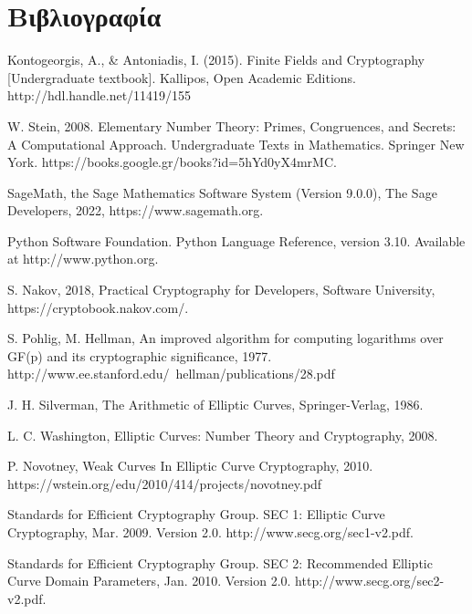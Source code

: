 \documentclass[oneside,a4paper]{article}
\begin{document}
\section{Βιβλιογραφία}
\vspace*{0.5cm}
\begingroup
\renewcommand{\section}[2]{}%
\begin{thebibliography}{}


	Kontogeorgis, A., \& Antoniadis, I. (2015). Finite Fields and Cryptography [Undergraduate textbook]. Kallipos, Open Academic Editions. http://hdl.handle.net/11419/155 

	W. Stein, 2008. Elementary Number Theory: Primes, Congruences, and Secrets: A Computational Approach. Undergraduate Texts in Mathematics. Springer New York. https://books.google.gr/books?id=5hYd0yX4mrMC.

	SageMath, the Sage Mathematics Software System (Version 9.0.0), The Sage Developers, 2022, https://www.sagemath.org.

	Python Software Foundation. Python Language Reference, version 3.10. Available at http://www.python.org.

	S. Nakov, 2018, Practical Cryptography for Developers, Software University, https://cryptobook.nakov.com/.

	S. Pohlig, M. Hellman, An improved algorithm for computing logarithms over GF(p) and its cryptographic significance, 1977. http://www.ee.stanford.edu/~hellman/publications/28.pdf

	J. H. Silverman, The Arithmetic of Elliptic Curves, Springer-Verlag, 1986.

	L. C. Washington, Elliptic Curves: Number Theory and Cryptography, 2008.

	P. Novotney, Weak Curves In Elliptic Curve Cryptography, 2010. https://wstein.org/edu/2010/414/projects/novotney.pdf


	Standards for Efficient Cryptography Group. SEC 1: Elliptic Curve Cryptography, Mar. 2009. Version 2.0. http://www.secg.org/sec1-v2.pdf.

	Standards for Efficient Cryptography Group. SEC 2: Recommended Elliptic Curve Domain Parameters, Jan. 2010. Version 2.0. http://www.secg.org/sec2-v2.pdf.


\end{thebibliography}
\end{document}

